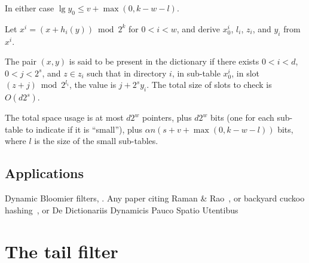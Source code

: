 \documentclass[11pt,letterpaper]{article}
\begin{document}
In either case $\lg y_0 \leq v + \max(0, k - w - l)$.



Let $x^i = (x + h_i(y)) \bmod 2^k$ for $0 < i < w$, and derive $x^i_0$, $l_i$, $z_i$, and $y_i$ from $x^i$.

The pair $(x,y)$ is said to be present in the dictionary if there exists $0 < i < d$, $0 < j < 2^s$, and $z \in z_i$ such that in directory $i$, in sub-table $x^i_0$, in slot $(z + j) \bmod 2^{l_i}$, the value is $j + 2^s y_i$.
The total size of slots to check is $O(d 2^s)$.

The total space usage is at most $d 2^w$ pointers, plus $d 2^w$ bits (one for each sub-table to indicate if it is ``small''), plus $\alpha n (s + v + \max(0, k - w - l))$ bits, where $l$ is the size of the small sub-tables.






\subsection{Applications}

Dynamic Bloomier filters, \cite{DBLP:journals/corr/abs-cs-0502032}. Any paper citing Raman \& Rao~\cite{raman2003succinct}, or backyard cuckoo hashing~\cite{DBLP:journals/corr/abs-0912-5424}, or De Dictionariis Dynamicis Pauco Spatio Utentibus~\cite{DBLP:journals/corr/abs-cs-0512081}

\section{The tail filter}
\end{document}
